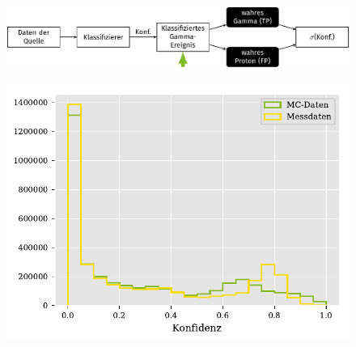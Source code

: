 \documentclass[aspectratio=1610, professionalfonts, 9pt]{beamer}
\begin{document}
\begin{frame}
  \begin{minipage}[t][0.3\textheight][t]{\textwidth}
	\begin{figure}
	  \includegraphics[scale=0.5]{./tikz/Conf/Conf3.pdf}
	\end{figure}
  \end{minipage}
  \begin{minipage}[t][0.7\textheight][t]{\textwidth}
	\begin{figure}
	  \centering
	  \includegraphics[height=0.6\textheight]{Plots/conf.pdf}
	\end{figure}
  \end{minipage}
\end{frame}
\end{document}
